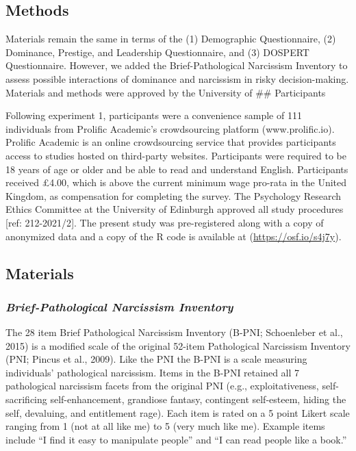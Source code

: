 \documentclass[
]{article}
\begin{document}
\hypertarget{methods}{%
\subsection{Methods}\label{methods}}

Materials remain the same in terms of the (1) Demographic Questionnaire,
(2) Dominance, Prestige, and Leadership Questionnaire, and (3) DOSPERT
Questionnaire. However, we added the Brief-Pathological Narcissism
Inventory to assess possible interactions of dominance and narcissism in
risky decision-making. Materials and methods were approved by the
University of \#\# Participants

Following experiment 1, participants were a convenience sample of 111
individuals from Prolific Academic's crowdsourcing platform
(www.prolific.io). Prolific Academic is an online crowdsourcing service
that provides participants access to studies hosted on third-party
websites. Participants were required to be 18 years of age or older and
be able to read and understand English. Participants received £4.00,
which is above the current minimum wage pro-rata in the United Kingdom,
as compensation for completing the survey. The Psychology Research
Ethics Committee at the University of Edinburgh approved all study
procedures {[}ref: 212-2021/2{]}. The present study was pre-registered
along with a copy of anonymized data and a copy of the R code is
available at (\url{https://osf.io/s4j7y}).

\hypertarget{materials}{%
\subsection{Materials}\label{materials}}

\hypertarget{brief-pathological-narcissism-inventory}{%
\subsubsection{\texorpdfstring{\emph{Brief-Pathological Narcissism
Inventory}}{Brief-Pathological Narcissism Inventory}}\label{brief-pathological-narcissism-inventory}}

The 28 item Brief Pathological Narcissism Inventory (B-PNI; Schoenleber
et al., 2015) is a modified scale of the original 52-item Pathological
Narcissism Inventory (PNI; Pincus et al., 2009). Like the PNI the B-PNI
is a scale measuring individuals' pathological narcissism. Items in the
B-PNI retained all 7 pathological narcissism facets from the original
PNI (e.g., exploitativeness, self-sacrificing self-enhancement,
grandiose fantasy, contingent self-esteem, hiding the self, devaluing,
and entitlement rage). Each item is rated on a 5 point Likert scale
ranging from 1 (not at all like me) to 5 (very much like me). Example
items include ``I find it easy to manipulate people'' and ``I can read
people like a book.''
\end{document}
